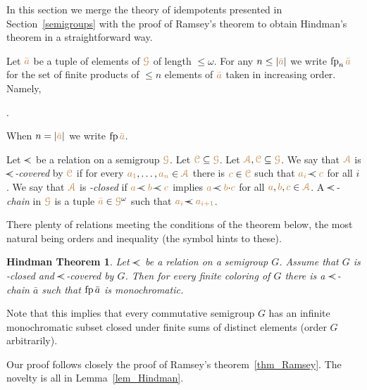 \documentclass[creche.tex]{subfiles}
\begin{document}
\def\reladot{\ooalign{$\kern1ex\cdot$\cr$\rela$\cr}}

In this section we merge the theory of idempotents presented in Section~\ref{semigroups}
with the proof of Ramsey's theorem to obtain Hindman's theorem in a straightforward way. 


Let ${\color{brown}\bar a}$ be a tuple of elements of ${\color{brown}\EuScript G}$ of length $\le\omega$. 
For any $n\le|{\color{brown}\bar a}|$ we write ${\rm fp}_n\,{\color{brown}\bar a}$ for the set of 
finite products of $\le n$ elements of ${\color{brown}\bar a}$ taken in increasing order.
Namely,

.

When $n=|{\color{brown}\bar a}|$ we write \emph{${\rm fp}\,{\color{brown}\bar a}$}.

Let \emph{$\rela$\/} be a relation on a semigroup ${\color{brown}\EuScript G}$. 
Let ${\color{brown}\EuScript C}\subseteq{\color{brown}\EuScript G}$.
Let ${\color{brown}{\EuScript A}},{\color{brown}\EuScript C}\subseteq{\color{brown}\EuScript G}$.
We say that ${\color{brown}{\EuScript A}}$ is \emph{$\rela$-covered\/} by ${\color{brown}\EuScript C}$ 
if for every ${\color{brown} a_1},\dots,{\color{brown} a_n}\in{\color{brown}{\EuScript A}}$ there is ${\color{brown} c}\in{\color{brown}\EuScript C}$ such that ${\mr a_i}\rela{\mr c}$ for all $i$. 
We say that ${\color{brown}{\EuScript A}}$ is \emph{\reladot-closed\/} 
if ${\mr a}\rela{\mr b}\rela{\mr c}$ implies ${\mr a}\rela{\mr b}{\cdot}{\mr c}$ 
for all ${\color{brown} a},{\color{brown} b},{\color{brown} c}\in{\color{brown}{\EuScript A}}$.
A \emph{$\rela$-chain\/} in ${\color{brown}\EuScript G}$ is a tuple ${\color{brown}\bar a}\in{\color{brown}\EuScript G}^\omega$ such that ${\mr a_i}\rela{\mr a_{i+1}}$.

There plenty of relations meeting the conditions of the theorem below, the most natural being orders and inequality (the symbol hints to these).

\theoremstyle{mio}
\newtheorem{Hindman}[thm]{Hindman Theorem}
\begin{Hindman}\label{thm_Hindman}
Let $\rela$ be a relation on a semigroup $G$.
Assume that $G$ is  \reladot-closed and $\rela$-covered by $G$.
Then for every finite coloring of $G$ 
there is a $\rela$-chain $\bar a$ such that ${\rm fp}\,\bar a$ is monochromatic.
\end{Hindman}

Note that this implies that every commutative semigroup $G$ has an infinite monochromatic subset closed under finite sums of distinct elements (order $G$ arbitrarily).

Our proof follows closely the proof of Ramsey's theorem~\ref{thm_Ramsey}.
The novelty is all in Lemma~\ref{lem_Hindman}.
\end{document}
